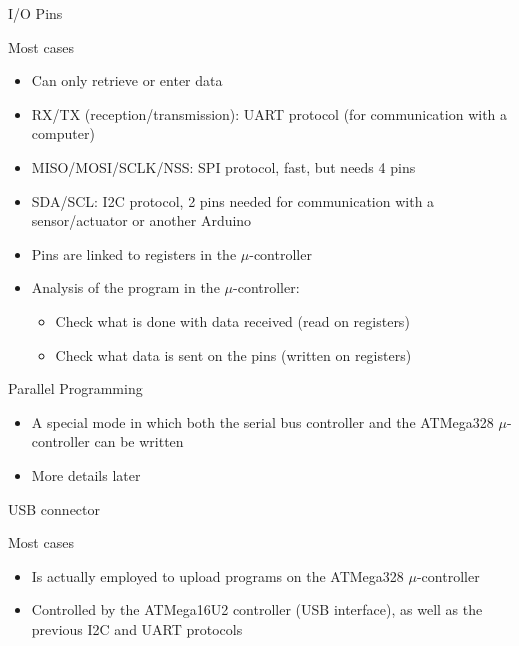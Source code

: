 \begin{reveals}

\begin{frame}{I/O Pins}
  
  \begin{block}{Most cases}
    \begin{itemize}
    \item Can only retrieve or enter data
    \item RX/TX (reception/transmission): UART protocol (for
      communication with a computer)
    \item MISO/MOSI/SCLK/NSS: SPI protocol, fast, but needs 4 pins
    \item SDA/SCL: I2C protocol, 2 pins needed for communication with
      a sensor/actuator or another Arduino
    \item Pins are linked to registers in the \(\mu\)-controller
    \item Analysis of the program in the \(\mu\)-controller:
      \begin{itemize}
      \item Check what is done with data received (read on registers)
      \item Check what data is sent on the pins (written on registers)
      \end{itemize}
    \end{itemize}
  \end{block}

  \vfill

  \begin{block}{Parallel Programming}
    \begin{itemize}
    \item A special mode in which both the serial bus controller and
      the ATMega328 \(\mu\)-controller can be written
    \item More details later
    \end{itemize}
  \end{block}

\end{frame}

\begin{frame}[c]{USB connector}
  
  \begin{block}{Most cases}
    \begin{itemize}
    \item Is actually employed to upload programs on the ATMega328
      \(\mu\)-controller
    \item Controlled by the ATMega16U2 controller (USB interface), as
      well as the previous I2C and UART protocols
    \end{itemize}
  \end{block}


\end{frame}
\end{reveals}
